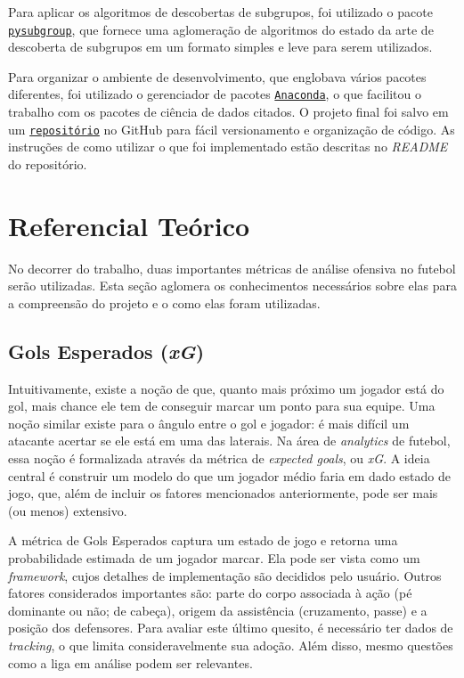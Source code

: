 \documentclass{article}
\begin{document}
Para aplicar os algoritmos de descobertas de subgrupos, foi utilizado o pacote
\href{https://pysubgroup.readthedocs.io/en/latest/}{\texttt{pysubgroup}}, que
fornece uma aglomeração de algoritmos do estado da arte de descoberta de
subgrupos em um formato simples e leve para serem utilizados.


Para organizar o ambiente de desenvolvimento, que englobava vários pacotes
diferentes, foi utilizado o gerenciador de pacotes
\href{https://www.anaconda.com/}{\texttt{Anaconda}}, o que facilitou o trabalho
com os pacotes de ciência de dados citados. O projeto final foi salvo em um
\href{https://github.com/lframosferreira/projeto-ad}{\texttt{repositório}}
no GitHub para fácil versionamento e organização de código. As instruções de
como utilizar o que foi implementado estão descritas no \textit{README}
do repositório.

\section{Referencial Teórico}

No decorrer do trabalho, duas importantes métricas de análise ofensiva no
futebol serão utilizadas. Esta seção
aglomera os conhecimentos necessários sobre elas para a compreensão do projeto
e o como elas foram utilizadas.

\subsection{Gols Esperados (\textit{xG})}

Intuitivamente, existe a noção de que, quanto mais próximo um jogador está do
gol, mais chance ele tem de conseguir marcar um ponto para sua equipe. Uma
noção similar existe para o ângulo entre o gol e jogador: é mais difícil um
atacante acertar se ele está em uma das laterais. Na área de \textit{analytics}
de futebol, essa noção é formalizada através da métrica de \textit{expected
goals}, ou \textit{xG}. A ideia central é construir um modelo do que um jogador
médio faria em dado estado de jogo, que, além de incluir os fatores mencionados
anteriormente, pode ser mais (ou menos) extensivo.

A métrica de Gols Esperados captura um estado de jogo e retorna uma
probabilidade estimada de um jogador marcar. Ela pode ser vista como um
\textit{framework}, cujos detalhes de implementação são decididos pelo usuário.
Outros fatores considerados importantes são: parte do corpo associada à ação
(pé dominante ou não; de cabeça), origem da assistência (cruzamento, passe) e a
posição dos defensores. Para avaliar este último quesito, é necessário ter
dados de \textit{tracking}, o que limita consideravelmente sua adoção. Além disso,
mesmo questões como a liga em análise podem ser relevantes.
\end{document}
